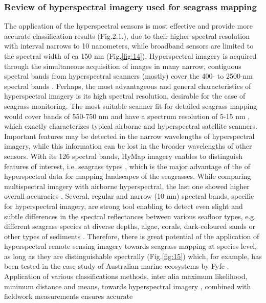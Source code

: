 \documentclass[10pt, a4paper]{article}
\begin{document}
\subsubsection{Review of hyperspectral imagery used for seagrass mapping}
The application of the hyperspectral sensors is most effective and provide more accurate classification
results (Fig.2.1.), due to their higher spectral resolution \cite{Bharathi03}\label{Bharathi03} with interval
narrows to 10 nanometers, while broadband sensors are limited to the spectral width of ca
150 nm (Fig.\ref{fig:14}). 
Hyperspectral imagery is acquired through the simultaneous acquisition of images in many
narrow, contiguous spectral bands from hyperspectral scanners (mostly) cover the 400-
to 2500-nm spectral bands \cite{Schmidt03}\label{Schmidt03}.
Perhaps, the most advantageous and general characteristics of hyperspectral imagery is its
high spectral resolution, desirable for the case of seagrass monitoring. 
The most suitable
scanner fit for detailed seagrass mapping would cover bands of 550-750 nm and have a spectrum
resolution of 5-15 nm \cite{Fyfe04}\label{Fyfe04}, which exactly characterizes typical airborne and
hyperspectral satellite scanners. Important features may be detected in the narrow
wavelengths of hyperspectral imagery, while this information can be lost in the broader
wavelengths of other sensors. With its 126 spectral bands, HyMap imagery enables to
distinguish features of interest, i.e. seagrass types \cite{Peneva07}\label{Peneva07}, which is the major
advantage of the of hyperspectral data for mapping landscapes of the seagrasses.
While comparing multispectral imagery with airborne hyperspectral, the last one showed higher
overall accuracies \cite{Phinn08}\label{Phinn08}. Several, regular and narrow (10 nm) spectral bands, specific for
hyperspectral imagery, are strong tool enabling to detect even slight and subtle differences in the
spectral reflectances between various seafloor types, e.g. different seagrass species at diverse depths,
algae, corals, dark-coloured sands or other types of sediments \cite{Hochberg03a}\label{Hochberg03a}. 
Therefore, there is great potential of the application of hyperspectral remote sensing imagery towards seagrass
mapping at species level, as long as they are distinguishable spectrally (Fig.\ref{fig:15}) which, for example, has been
tested in the case study of Australian marine ecosystems by Fyfe \cite{Fyfe04}\label{Fyfe04}. Application of various
classifications methods, inter alia maximum likelihood, minimum distance and means, towards
hyperspectral imagery \cite{Peneva08}\label{Peneva08}, combined with fieldwork measurements ensures accurate
\end{document}
